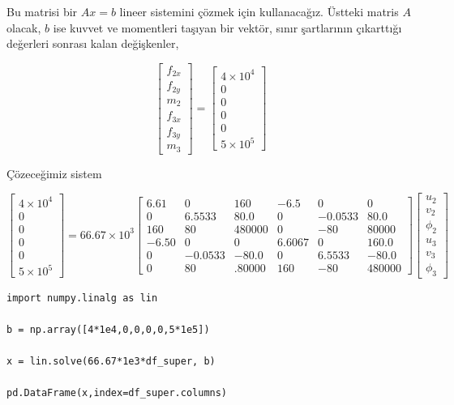 \documentclass[12pt,fleqn]{article}\usepackage{../../common}
\begin{document}
Bu matrisi bir $Ax = b$ lineer sistemini çözmek için kullanacağız. Üstteki
matris $A$ olacak, $b$ ise kuvvet ve momentleri taşıyan bir vektör,
sınır şartlarının çıkarttığı değerleri sonrası kalan değişkenler,

$$
\left[\begin{array}{c}
f_{2x} \\ f_{2y} \\ m_{2} \\ f_{3x} \\ f_{3y} \\ m_{3} 
\end{array}\right] =
\left[\begin{array}{c}
4 \times 10^4 \\ 0 \\ 0 \\ 0 \\ 0 \\ 5 \times 10^5
\end{array}\right]
$$

Çözeceğimiz sistem

$$
\left[\begin{array}{c}
4 \times 10^4 \\ 0 \\ 0 \\ 0 \\ 0 \\ 5 \times 10^5
\end{array}\right]
=
66.67 \times 10^3
\left[\begin{array}{cccccc}
  6.61 &  0 &     160 &   -6.5 &   0   &    0 \\
  0    & 6.5533 &  80.0 &    0 &  -0.0533 &   80.0 \\
160 &  80 &  480000 &    0 & -80 &   80000 \\
 -6.50 &   0 &       0 &    6.6067 &   0 &     160.0 \\
  0 &  -0.0533 &     -80.0 &    0 &   6.5533 &     -80.0 \\
  0 &  80 &.   80000 &  160 & -80 &  480000 
\end{array}\right]
\left[\begin{array}{c}
u_2 \\ v_2 \\ \phi_2 \\ u_3 \\ v_3 \\ \phi_3
\end{array}\right]
$$

\begin{verbatim}
import numpy.linalg as lin

b = np.array([4*1e4,0,0,0,0,5*1e5])

x = lin.solve(66.67*1e3*df_super, b)

pd.DataFrame(x,index=df_super.columns)
\end{verbatim}
\end{document}
